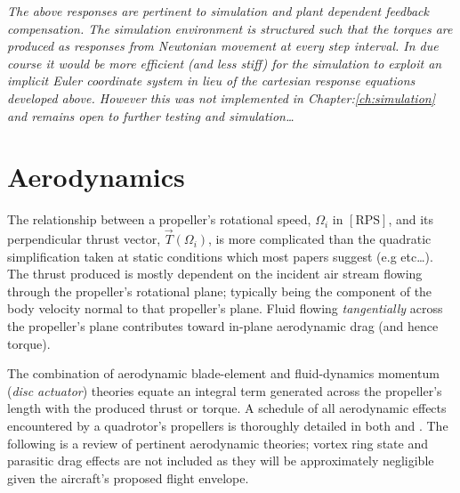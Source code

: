 \par
\emph{\color{Gray}The above responses are pertinent to simulation and plant dependent feedback compensation. The simulation environment is structured such that the torques are produced as responses from Newtonian movement at every step interval. In due course it would be more efficient (and less stiff) for the simulation to exploit an implicit Euler\cite{physicallybased,multibodydynamics} coordinate system in lieu of the cartesian response equations developed above. However this was not implemented in Chapter:\ref{ch:simulation} and remains open to further testing and simulation\ldots}

\section{Aerodynamics}
\label{sec:dynamics.aero}
The relationship between a propeller's rotational speed, $\Omega_i$ in $[\text{RPS}]$, and its perpendicular thrust vector, $\vec{T}(\Omega_i)$, is more complicated than the quadratic simplification taken at static conditions which most papers suggest (e.g \cite{x4flyer,modelingquadcopter} etc\ldots). The thrust produced is mostly dependent on the incident air stream flowing through the propeller's rotational plane; typically being the component of the body velocity normal to that propeller's plane. Fluid flowing \emph{tangentially} across the propeller's plane contributes toward in-plane aerodynamic drag (and hence torque). 
\par
The combination of aerodynamic blade-element\cite{bem,forwarddescent} and fluid-dynamics momentum (\emph{disc actuator}) theories equate an integral term generated across the propeller's length with the produced thrust or torque. A schedule of all aerodynamic effects encountered by a quadrotor's propellers is thoroughly detailed in both \cite{bladesforquadrotors} and \cite{nonlineardynamics}. The following is a review of pertinent aerodynamic theories; vortex ring state and parasitic drag effects are not included as they will be approximately negligible given the aircraft's proposed flight envelope.
